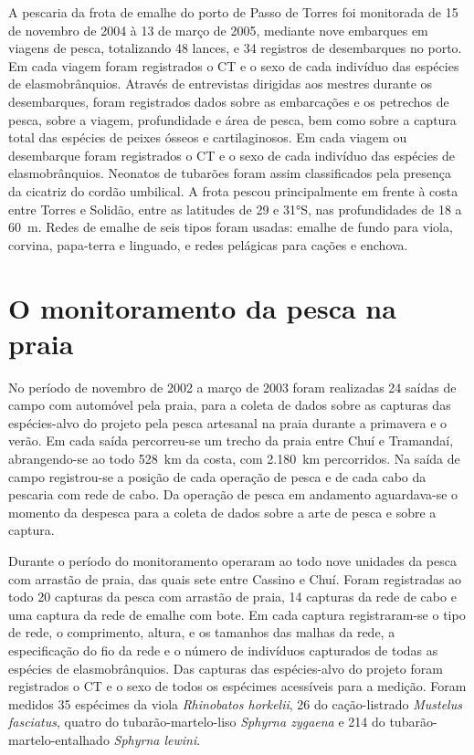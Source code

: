 \documentclass[a4paper,11pt,twoside,showtrims,onecolumn,openright,final]{memoir}
\begin{document}
A pescaria da frota de emalhe do porto de Passo de Torres foi monitorada de 15 de novembro 
de 2004 à 13 de março de 2005, mediante nove embarques em viagens de pesca, totalizando 48 lances, 
e 34 registros de desembarques no porto. Em cada viagem foram registrados 
o CT e o sexo de cada indivíduo das espécies de elasmobrânquios. 
Através de entrevistas dirigidas aos mestres durante 
os desembarques, foram registrados dados sobre as embarcações e os petrechos de pesca, 
sobre a viagem, profundidade e área de pesca, bem como sobre a captura total das espécies 
de peixes ósseos e cartilaginosos. Em cada viagem ou desembarque foram registrados 
o CT e o sexo de cada indivíduo das espécies de elasmobrânquios. Neonatos de tubarões foram assim 
classificados pela presença da cicatriz do cordão umbilical.
A frota pescou principalmente em frente à costa entre Torres e Solidão, entre as latitudes de 29 e 31°S, 
nas profundidades de 18 a 60~m. Redes de emalhe de seis tipos foram usadas: emalhe de 
fundo para viola, corvina, papa-terra e linguado, e redes pelágicas para cações
e enchova. 

\section*{O monitoramento da pesca na praia}

No período de novembro de 2002 a março de 2003 foram realizadas 24 saídas de campo com automóvel 
pela praia, para a coleta de dados sobre as capturas das espécies-alvo do projeto pela pesca artesanal 
na praia durante a primavera e o verão. Em cada saída percorreu-se um trecho da praia entre Chuí 
e Tramandaí, abrangendo-se ao todo 528~km da costa, com 2.180~km percorridos. Na saída de campo 
registrou-se a posição de cada operação de pesca e de cada cabo da pescaria com rede de cabo.
Da operação de pesca em andamento aguardava-se o momento da despesca para a coleta de dados sobre a 
arte de pesca e sobre a captura.

Durante o período do monitoramento operaram ao todo nove unidades da pesca com arrastão de praia, %
das quais sete entre Cassino e Chuí. Foram registradas ao todo 20 capturas da pesca com arrastão 
de praia, 14 capturas da rede de cabo e uma captura da rede de emalhe com bote. Em cada captura 
registraram-se o tipo de rede, o comprimento, altura, 
e os tamanhos das malhas da rede, a especificação do fio da rede e o número de indivíduos capturados 
de todas as espécies de elasmobrânquios.  
Das capturas das espécies-alvo do projeto foram registrados o CT e o sexo de todos 
os espécimes acessíveis para a medição. Foram medidos 35 espécimes da viola \emph{Rhinobatos horkelii},
26 do cação-listrado \emph{Mustelus fasciatus}, quatro do tubarão-martelo-liso \emph{Sphyrna zygaena} e 214 
do tubarão-martelo-entalhado \emph{Sphyrna lewini}.
\end{document}
